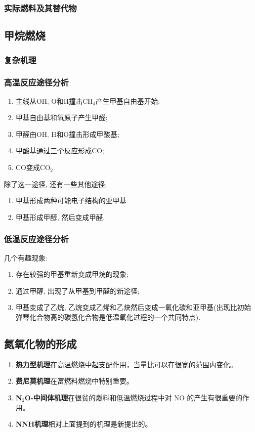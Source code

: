 \subsubsection{实际燃料及其替代物}

\subsection{甲烷燃烧}
\subsubsection{复杂机理}
\subsubsection{高温反应途径分析}
\begin{enumerate}
    \item 主线从OH, O和H撞击CH\(_4\)产生甲基自由基开始;
    \item 甲基自由基和氧原子产生甲醛;
    \item 甲醛由OH, H和O撞击形成甲酸基;
    \item 甲酸基通过三个反应形成CO;
    \item CO变成CO\(_2\).
\end{enumerate}

除了这一途径, 还有一些其他途径:
\begin{enumerate}
    \item 甲基形成两种可能电子结构的亚甲基
    \item 甲基形成甲醇, 然后变成甲醛.
\end{enumerate}
\subsubsection{低温反应途径分析}
几个有趣现象:
\begin{enumerate}
    \item 存在较强的甲基重新变成甲烷的现象;
    \item 通过甲醇, 出现了从甲基到甲醛的新途径;
    \item 甲基变成了乙烷, 乙烷变成乙烯和乙炔然后变成一氧化碳和亚甲基(出现比初始弹琴化合物高的碳氢化合物是低温氧化过程的一个共同特点).
\end{enumerate}

\subsection{氮氧化物的形成}

\begin{enumerate}
    \item \textbf{热力型机理}在高温燃烧中起支配作用，当量比可以在很宽的范围内变化。
    \item \textbf{费尼莫机理}在富燃料燃烧中特别重要。
    \item \textbf{N\(_2\)O-中间体机理}在很贫的燃料和低温燃烧过程中对 NO 的产生有很重要的作用。
    \item \textbf{NNH机理}相对上面提到的机理是新提出的。
\end{enumerate}

